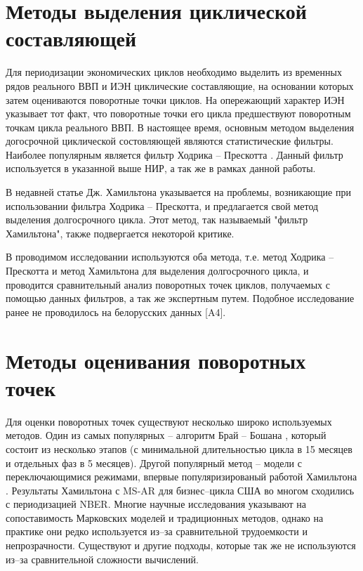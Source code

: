 \documentclass[../report.tex]{subfiles}
\begin{document}
	
	\section{Методы выделения циклической составляющей}
	
	Для периодизации экономических циклов необходимо выделить из временных рядов реального ВВП и ИЭН циклические составляющие, на основании которых затем оцениваются поворотные точки циклов. На опережающий характер ИЭН указывает тот факт, что поворотные точки его цикла предшествуют поворотным точкам цикла реального ВВП. В настоящее время, основным методом выделения догосрочной циклической состовляющей являются статистические фильтры. Наиболее популярным является фильтр Ходрика – Прескотта \cite{oecdCycleExtraction,estrellaFilterDo}. Данный фильтр используется в указанной выше НИР, а так же в рамках данной работы. 
	
	В недавней статье Дж. Хамильтона \cite{hamHP} указывается на проблемы, возникающие при использовании фильтра Ходрика – Прескотта, и предлагается свой метод выделения долгосрочного цикла. Этот метод, так называемый "фильтр Хамильтона", также подвергается некоторой критике.
	
	В проводимом исследовании используются оба метода, т.е. метод Ходрика – Прескотта и метод Хамильтона для выделения долгосрочного цикла, и проводится сравнительный анализ поворотных точек циклов, получаемых с помощью данных фильтров, а так же экспертным путем. Подобное исследование ранее не проводилось на белорусских данных [A4]. \iffalse \cite{makarevich_bsu_conf_2017}.\fi
	
	
	\section{Методы оценивания поворотных точек}
	
	Для оценки поворотных точек существуют несколько широко используемых методов. Один из самых популярных – алгоритм Брай – Бошана \cite{bryCyclicalAnalysis}, который состоит из несколько этапов (с минимальной длительностью цикла в 15 месяцев и отдельных фаз в 5 месяцев). Другой популярный метод – модели с переключающимися режимами, впервые популяризированый работой Хамильтона \cite{hamNewApproach}. Результаты Хамильтона с MS-AR для бизнес–цикла США во многом сходились с периодизацией NBER. Многие научные исследования \cite{bodmanCanada,brunoItaly,hardingTwoMethods} указывают на сопоставимость Марковских моделей и традиционных методов, однако на практике они редко используется из–за сравнительной трудоемкости и непрозрачности. Существуют и другие подходы, которые так же не используются из–за сравнительной сложности вычислений.
	
\end{document}
